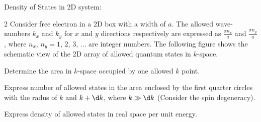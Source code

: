 \clearpage
\begin{problem}
  Density of States in 2D system:
  \begin{paracol}{2}
    Consider free electron in a 2D box with a width of $a$.
    The allowed wave-numbers $k_x$ and $k_y$ for $x$ and $y$ directions
    respectively are expressed as $\frac{\pi n_x}a$ and $\frac{\pi n_y}{a}$,
    where $n_x$, $n_y = 1$, $2$, $3$, $\ldots$ are integer numbers.
    The following figure shows the schematic view of the 2D array of
    allowed quantum states in $k$-space.
    \switchcolumn \centering
  \end{paracol}
  \begin{enumext}[label = (\alph*)]
    \item Determine the area in $k$-space occupied by one allowed $k$ point.
    \item Express number of allowed states in the area enclosed
    by the first quarter circles with the radus of $k$ and $k + \d k$,
    where $k \gg \d k$ (Consider the spin degeneracy).
    \item Express density of allowed states in real space per unit energy.
  \end{enumext}
\end{problem}
